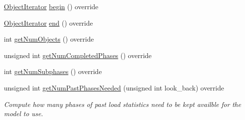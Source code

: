\begin{DoxyCompactItemize}
\hyperlink{classvt_1_1vrt_1_1collection_1_1balance_1_1_object_iterator}{Object\+Iterator} \hyperlink{structvt_1_1vrt_1_1collection_1_1balance_1_1_raw_data_a54351249212ade8b2d25a857e71b256f}{begin} () override
\item 
\hyperlink{classvt_1_1vrt_1_1collection_1_1balance_1_1_object_iterator}{Object\+Iterator} \hyperlink{structvt_1_1vrt_1_1collection_1_1balance_1_1_raw_data_a07ae6234d91c2daa7c2d51117b224f7d}{end} () override
\item 
int \hyperlink{structvt_1_1vrt_1_1collection_1_1balance_1_1_raw_data_a586c3223d1f69ee9d5eb2930ff659051}{get\+Num\+Objects} () override
\item 
unsigned int \hyperlink{structvt_1_1vrt_1_1collection_1_1balance_1_1_raw_data_a151f3230094feacd15015f51980b8e9e}{get\+Num\+Completed\+Phases} () override
\item 
int \hyperlink{structvt_1_1vrt_1_1collection_1_1balance_1_1_raw_data_aeb7830328dfb72f11740e79eed6a23aa}{get\+Num\+Subphases} () override
\item 
unsigned int \hyperlink{structvt_1_1vrt_1_1collection_1_1balance_1_1_raw_data_a8f709c3aeaf10e92c746d773d7ba6f9c}{get\+Num\+Past\+Phases\+Needed} (unsigned int look\+\_\+back) override
\begin{DoxyCompactList}\small\item\em Compute how many phases of past load statistics need to be kept availble for the model to use. \end{DoxyCompactList}\end{DoxyCompactItemize}
